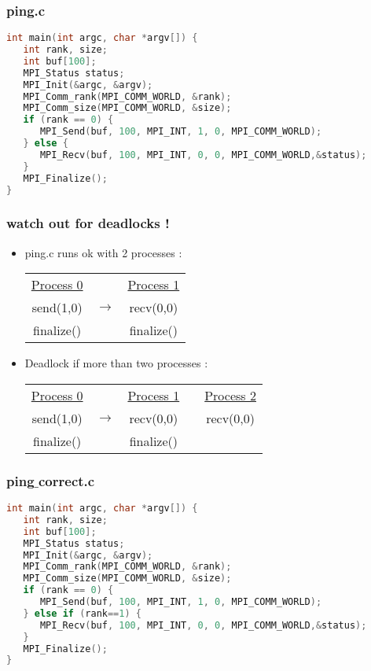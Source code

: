 \begin{frame}[containsverbatim]
\frametitle{ping.c}
\begin{lstlisting}[language=C,frame=lines]
int main(int argc, char *argv[]) {
   int rank, size;
   int buf[100];
   MPI_Status status;
   MPI_Init(&argc, &argv);
   MPI_Comm_rank(MPI_COMM_WORLD, &rank);
   MPI_Comm_size(MPI_COMM_WORLD, &size);
   if (rank == 0) {
      MPI_Send(buf, 100, MPI_INT, 1, 0, MPI_COMM_WORLD);
   } else {
      MPI_Recv(buf, 100, MPI_INT, 0, 0, MPI_COMM_WORLD,&status);
   }
   MPI_Finalize();
}
\end{lstlisting}

\end{frame}


\begin{frame}[containsverbatim]
\frametitle{watch out for deadlocks !}
\begin{itemize}
	\item{ping.c runs ok with 2 processes : \\
		\begin{tabular}{ c c c }
		  \underline{Process 0} &   & \underline{Process 1} \\
		  send(1,0) & $\longrightarrow$  & recv(0,0) \\
		  finalize() &  & finalize() \\
		\end{tabular}
	}
	\item{Deadlock if more than two processes : \\
		\begin{tabular}{ c c c c c}
		  \underline{Process 0} &   & \underline{Process 1} &  & \underline{Process 2} \\
		  send(1,0) & $\longrightarrow$  & recv(0,0) & & recv(0,0) \\
		  finalize() &  & finalize() \\
		\end{tabular}		
	}
\end{itemize}
\end{frame}


\begin{frame}[containsverbatim]
\frametitle{ping$\_$correct.c}
\begin{lstlisting}[language=C,frame=lines]
int main(int argc, char *argv[]) {
   int rank, size;
   int buf[100];
   MPI_Status status;
   MPI_Init(&argc, &argv);
   MPI_Comm_rank(MPI_COMM_WORLD, &rank);
   MPI_Comm_size(MPI_COMM_WORLD, &size);
   if (rank == 0) {
      MPI_Send(buf, 100, MPI_INT, 1, 0, MPI_COMM_WORLD);
   } else if (rank==1) {
      MPI_Recv(buf, 100, MPI_INT, 0, 0, MPI_COMM_WORLD,&status);
   }
   MPI_Finalize();
}
\end{lstlisting}
\end{frame}

